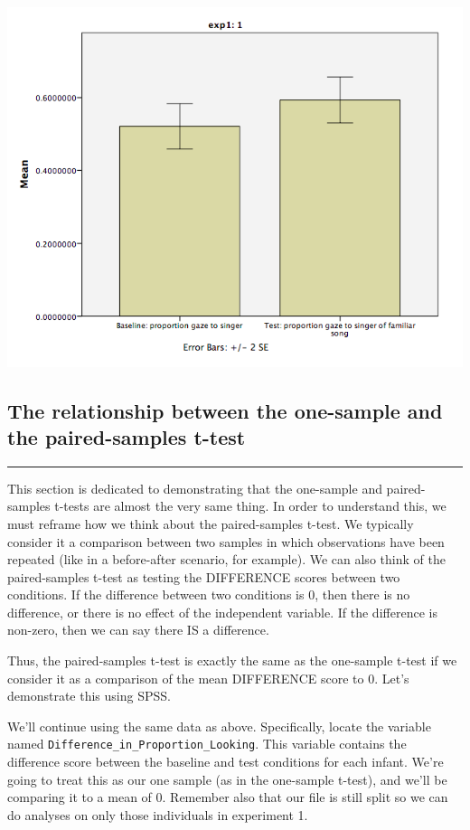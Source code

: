 \documentclass[
]{book}
\begin{document}
\includegraphics{img/6.4.30.png}

\hypertarget{the-relationship-between-the-one-sample-and-the-paired-samples-t-test}{%
\subsection{The relationship between the one-sample and the paired-samples t-test}\label{the-relationship-between-the-one-sample-and-the-paired-samples-t-test}}

\begin{center}\rule{0.5\linewidth}{0.5pt}\end{center}

This section is dedicated to demonstrating that the one-sample and paired-samples t-tests are almost the very same thing. In order to understand this, we must reframe how we think about the paired-samples t-test. We typically consider it a comparison between two samples in which observations have been repeated (like in a before-after scenario, for example). We can also think of the paired-samples t-test as testing the DIFFERENCE scores between two conditions. If the difference between two conditions is 0, then there is no difference, or there is no effect of the independent variable. If the difference is non-zero, then we can say there IS a difference.

Thus, the paired-samples t-test is exactly the same as the one-sample t-test if we consider it as a comparison of the mean DIFFERENCE score to 0. Let's demonstrate this using SPSS.

We'll continue using the same data as above. Specifically, locate the variable named \texttt{Difference\_in\_Proportion\_Looking}. This variable contains the difference score between the baseline and test conditions for each infant. We're going to treat this as our one sample (as in the one-sample t-test), and we'll be comparing it to a mean of 0. Remember also that our file is still split so we can do analyses on only those individuals in experiment 1.
\end{document}
